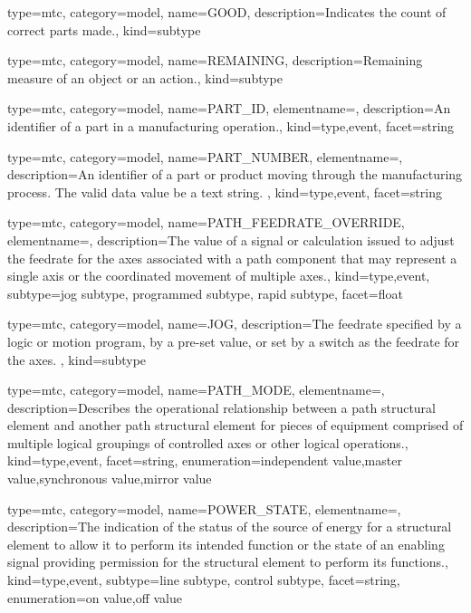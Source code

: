 {
  type=mtc,
  category=model,
  name={GOOD},
  description={Indicates the count of correct parts made.},
  kind={subtype}
}


{
  type=mtc,
  category=model,
  name={REMAINING},
  description={Remaining measure of an object or an action.},
  kind={subtype}
}


{
  type=mtc,
  category=model,
  name={PART\_ID},
  elementname=,
  description={An identifier of a part in a manufacturing operation.},
  kind={type,event},
  facet={\gls{string}}
}


{
  type=mtc,
  category=model,
  name={PART\_NUMBER},
  elementname=,
  description={An identifier of a part or product moving through the manufacturing process.  The \gls{valid data value} \must be a text string. },
  kind={type,event},
  facet={\gls{string}}
}


{
  type=mtc,
  category=model,
  name={PATH\_FEEDRATE\_OVERRIDE},
  elementname=,
  description={The value of a signal or calculation issued to adjust the feedrate for the axes associated with a \gls{path} component that may represent a single axis or the coordinated movement of multiple axes.},
  kind={type,event},
  subtype={\gls{jog subtype}, \gls{programmed subtype}, \gls{rapid subtype}},
  facet={\gls{float}}
}


{
  type=mtc,
  category=model,
  name={JOG},
  description={The feedrate specified by a logic or motion program, by a pre-set value, or set by a switch as the feedrate for the \gls{axes}. },
  kind={subtype}
}


{
  type=mtc,
  category=model,
  name={PATH\_MODE},
  elementname=,
  description={Describes the operational relationship between a \gls{path} \gls{structural element} and another \gls{path} \gls{structural element} for pieces of equipment comprised of multiple logical groupings of controlled axes or other logical operations.},
  kind={type,event},
  facet={\gls{string}},
  enumeration={\gls{independent value},\gls{master value},\gls{synchronous value},\gls{mirror value}}
}


{
  type=mtc,
  category=model,
  name={POWER\_STATE},
  elementname=,
  description={The indication of the status of the source of energy for a \gls{structural element} to allow it to perform its intended function or the state of an enabling signal providing permission for the \gls{structural element} to perform its functions.},
  kind={type,event},
  subtype={\gls{line subtype}, \gls{control subtype}},
  facet={\gls{string}},
  enumeration={\gls{on value},\gls{off value}}
}


